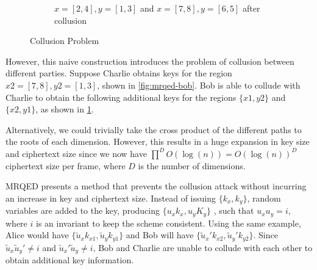 \documentclass[hyp,a4paper,12pt,openbib]{socreport}
\begin{document}
\begin{figure}[h]
\begin{subfigure}[t]{.33\textwidth}
\caption{$x=[2,4], y= [1,3]$ and $x=[7,8], y= [6,5]$ after collusion}
\label{fig:mrqed-collude}
\end{subfigure}
\caption{Collusion  Problem}
\label{fig:collusion}
\end{figure}

However, this naive construction introduces the problem of collusion between different parties. Suppose Charlie obtains keys for the region $ x2=[7,8], y2=[1,3]$, shown in \cref{fig:mrqed-bob}. Bob is able to collude with Charlie to obtain the following additional keys for the regions $\{x1, y2\}$ and $\{x2, y1\}$, as shown in \cref{fig:mrqed-collude}.

Alternatively, we could trivially take the cross product of the different paths to the roots of each dimension. However, this results in a huge expansion in key size and ciphertext size since we now have  $\displaystyle \prod^{D} O(\log(n)) = O(\log(n))^D$ ciphertext size per frame, where $D$ is the number of dimensions. 

MRQED \cite{shi2007multi} presents a method that prevents the collusion attack without incurring an increase in key and ciphertext size. Instead of issuing $\{k_{x},k_{y}\}$, 
random variables are added to the key, producing $\{{u}_{x} k_{x}, u_{y} K_{y}\}$ , such that $u_{x} {u}_{y} = i$, where $i$ is an invariant to keep the scheme consistent. Using the same example, Alice would have $\{ \tilde{u}_{x} k_{x1}, \tilde{u}_{y} k_{y1} \}$ and Bob will have 
$\{ \tilde{u}_{x}'k_{x2}, \tilde{u}_{y}'k_{y2} \}$. Since $\tilde{u}_{x}\tilde{u}_{y}' \neq i$ and  $\tilde{u}_{x}'\tilde{u}_{y} \neq i$, Bob and Charlie are unable to collude with each other to obtain additional key information.
\end{document}
